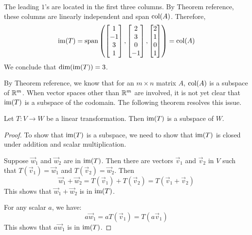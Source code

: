 \documentclass{ximera}
\begin{document}
\begin{example}
\begin{explanation}
The leading $1$'s are located in the first three columns.  By Theorem {\color{red} reference}, these columns are linearly independent and span $\textnormal{col}(A)$.  Therefore,
$$\textnormal{im}(T)=\textnormal{span}\left(\begin{bmatrix}1\\-1\\3\\1\end{bmatrix}, \begin{bmatrix}2\\3\\0\\-1\end{bmatrix}, \begin{bmatrix}2\\1\\0\\1\end{bmatrix}\right)=\textnormal{col}(A)$$
We conclude that $\textnormal{dim}(\textnormal{im}(T))=3$.

\end{explanation}
\end{example}

By Theorem {\color{red}reference}, we know that for an $m\times n$ matrix $A$, $\textnormal{col}(A)$ is a subspace of $\mathbb{R}^m$.  When vector spaces other than $\mathbb{R}^m$ are involved, it is not yet clear that $\textnormal{im}(T)$ is a subspace of the codomain. The following theorem resolves this issue.

\begin{theorem}\label{th:imagesubspace}
Let $T:V\rightarrow W$ be a linear transformation.  Then $\textnormal{im}(T)$ is a subspace of $W$.
\end{theorem}
\begin{proof}
To show that $\textnormal{im}(T)$ is a subspace, we need to show that $\textnormal{im}(T)$ is closed under addition and scalar multiplication.

Suppose $\vec{w}_1$ and $\vec{w}_2$ are in $\textnormal{im}(T)$.  Then there are vectors $\vec{v}_1$ and $\vec{v}_2$ in $V$ such that $T(\vec{v}_1)=\vec{w}_1$ and $T(\vec{v}_2)=\vec{w}_2$.  Then
$$\vec{w}_1+\vec{w}_2=T(\vec{v}_1)+T(\vec{v}_2)=T(\vec{v}_1+\vec{v}_2)$$
This shows that $\vec{w}_1+\vec{w}_2$ is in $\textnormal{im}(T)$.

For any scalar $a$, we have:
$$a\vec{w}_1=aT(\vec{v}_1)=T(a\vec{v}_1)$$
This shows that $a\vec{w}_1$ is in $\textnormal{im}(T)$.
\end{proof}
\end{document}
